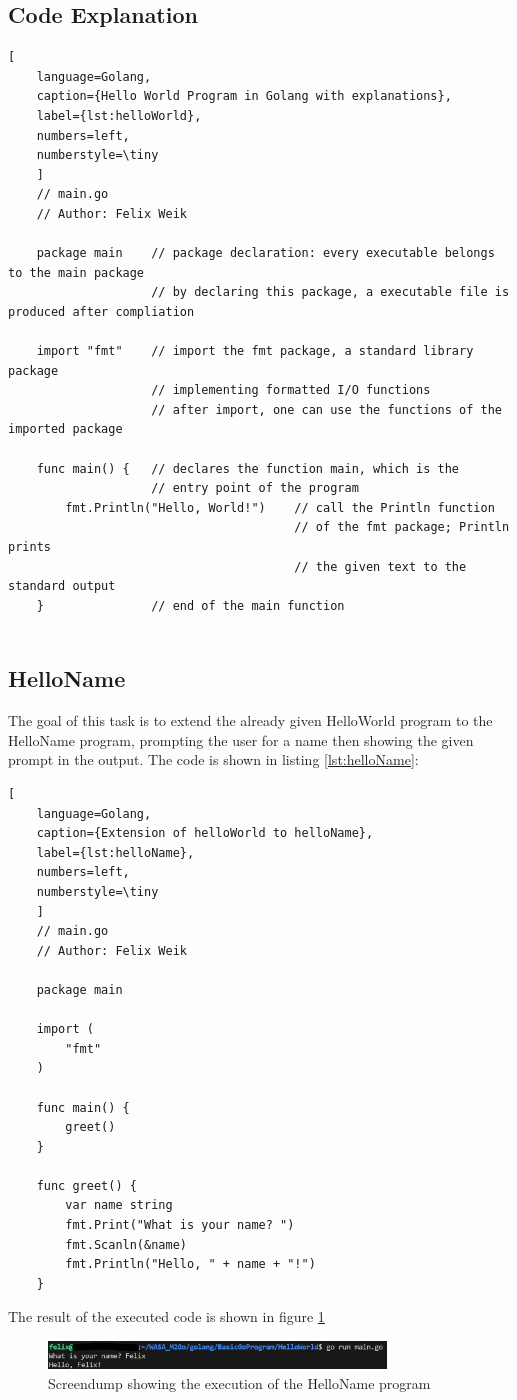 \subsection{Code Explanation}
\begin{lstlisting}[
    language=Golang,
    caption={Hello World Program in Golang with explanations},
    label={lst:helloWorld},
    numbers=left,
    numberstyle=\tiny
    ]
    // main.go 
    // Author: Felix Weik

    package main    // package declaration: every executable belongs to the main package
                    // by declaring this package, a executable file is produced after compliation
    
    import "fmt"    // import the fmt package, a standard library package 
                    // implementing formatted I/O functions
                    // after import, one can use the functions of the imported package

    func main() {   // declares the function main, which is the 
                    // entry point of the program
        fmt.Println("Hello, World!")    // call the Println function 
                                        // of the fmt package; Println prints 
                                        // the given text to the standard output
    }               // end of the main function
    
\end{lstlisting}

\subsection{HelloName}
The goal of this task is to extend the already given HelloWorld program to the HelloName program, prompting the user for a name then showing the given prompt in the output.
The code is shown in listing \ref{lst:helloName}:
\begin{lstlisting}[
    language=Golang,
    caption={Extension of helloWorld to helloName},
    label={lst:helloName},
    numbers=left,
    numberstyle=\tiny
    ]
    // main.go
    // Author: Felix Weik

    package main

    import (
        "fmt"
    )

    func main() {
        greet()
    }

    func greet() {
        var name string
        fmt.Print("What is your name? ")
        fmt.Scanln(&name)
        fmt.Println("Hello, " + name + "!")
    } 
\end{lstlisting}

The result of the executed code is shown in figure \ref{fig:screendump_helloName}

\begin{figure}
    \centering
    \includegraphics[width=0.8\textwidth]{figures/goLang/helloWorld/golang_helloWorld_helloName.png}
    \caption{Screendump showing the execution of the HelloName program}
    \label{fig:screendump_helloName}
\end{figure}